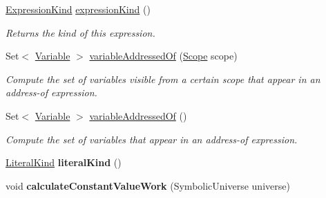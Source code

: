 \begin{DoxyCompactItemize}
\item 
\hyperlink{enumedu_1_1udel_1_1cis_1_1vsl_1_1civl_1_1model_1_1IF_1_1expression_1_1Expression_1_1ExpressionKind}{Expression\+Kind} \hyperlink{classedu_1_1udel_1_1cis_1_1vsl_1_1civl_1_1model_1_1common_1_1expression_1_1CommonIntegerLiteralExpression_a80e2c2029d8addeea6f42908d83711a1}{expression\+Kind} ()
\begin{DoxyCompactList}\small\item\em Returns the kind of this expression. \end{DoxyCompactList}\item 
Set$<$ \hyperlink{interfaceedu_1_1udel_1_1cis_1_1vsl_1_1civl_1_1model_1_1IF_1_1variable_1_1Variable}{Variable} $>$ \hyperlink{classedu_1_1udel_1_1cis_1_1vsl_1_1civl_1_1model_1_1common_1_1expression_1_1CommonIntegerLiteralExpression_ac550dcfc33b9023ae6f925f407a2345f}{variable\+Addressed\+Of} (\hyperlink{interfaceedu_1_1udel_1_1cis_1_1vsl_1_1civl_1_1model_1_1IF_1_1Scope}{Scope} scope)
\begin{DoxyCompactList}\small\item\em Compute the set of variables visible from a certain scope that appear in an address-\/of expression. \end{DoxyCompactList}\item 
Set$<$ \hyperlink{interfaceedu_1_1udel_1_1cis_1_1vsl_1_1civl_1_1model_1_1IF_1_1variable_1_1Variable}{Variable} $>$ \hyperlink{classedu_1_1udel_1_1cis_1_1vsl_1_1civl_1_1model_1_1common_1_1expression_1_1CommonIntegerLiteralExpression_ae1c1d3fea7d6ffba457d97e3503b81b4}{variable\+Addressed\+Of} ()
\begin{DoxyCompactList}\small\item\em Compute the set of variables that appear in an address-\/of expression. \end{DoxyCompactList}\item 
\hypertarget{classedu_1_1udel_1_1cis_1_1vsl_1_1civl_1_1model_1_1common_1_1expression_1_1CommonIntegerLiteralExpression_a27f1876bd3d5dee214b8112831843d5e}{}\hyperlink{enumedu_1_1udel_1_1cis_1_1vsl_1_1civl_1_1model_1_1IF_1_1expression_1_1LiteralExpression_1_1LiteralKind}{Literal\+Kind} {\bfseries literal\+Kind} ()\label{classedu_1_1udel_1_1cis_1_1vsl_1_1civl_1_1model_1_1common_1_1expression_1_1CommonIntegerLiteralExpression_a27f1876bd3d5dee214b8112831843d5e}

\item 
\hypertarget{classedu_1_1udel_1_1cis_1_1vsl_1_1civl_1_1model_1_1common_1_1expression_1_1CommonIntegerLiteralExpression_a77b686062128b35954717b50340088a2}{}void {\bfseries calculate\+Constant\+Value\+Work} (Symbolic\+Universe universe)\label{classedu_1_1udel_1_1cis_1_1vsl_1_1civl_1_1model_1_1common_1_1expression_1_1CommonIntegerLiteralExpression_a77b686062128b35954717b50340088a2}


\end{DoxyCompactItemize}
